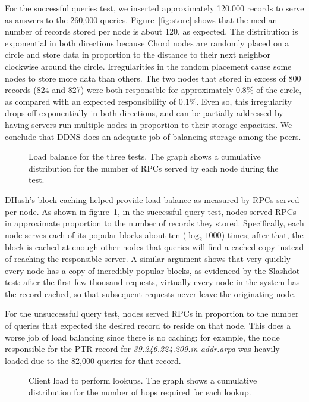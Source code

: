 For the successful queries test, we inserted approximately 120,000
records to serve as answers to the 260,000 queries.
Figure~\ref{fig:store} shows that the median number of
records stored per node is about 120, as expected.
The distribution is exponential in both directions because
Chord nodes are randomly placed on a circle and store data
in proportion to the distance to their next neighbor clockwise
around the circle.  Irregularities in the random placement cause
some nodes to store more data than others.
The two nodes that stored in excess of 800
records (824 and 827) were both responsible for approximately
0.8\% of the circle, as compared with an expected 
responsibility of 0.1\%.
Even so, this irregularity drops off exponentially in both
directions, and can be partially addressed by having servers
run multiple nodes in proportion to their storage capacities.
We conclude that DDNS does an adequate job of balancing
storage among the peers.

\begin{figure}
\caption{Load balance for the three tests.
The graph shows a cumulative distribution for the number
of RPCs served by each node during the test.}
\label{fig:both-rpc}
\end{figure}

DHash's block caching helped provide load balance as
measured by RPCs served per node.
As shown in figure~\ref{fig:both-rpc},
in the successful query test, nodes served RPCs in
approximate proportion to the number of records they stored.
Specifically, each node serves each of its popular blocks about
ten ($\log_2 1000$) times; after that, the block is cached
at enough other nodes that queries will find a cached copy
instead of reaching the responsible server.
A similar argument shows that very quickly every node has
a copy of incredibly popular blocks, as evidenced by the
Slashdot test: after the first few thousand requests, virtually
every node in the system has the record cached, so that
subsequent requests never leave the originating node.

For the unsuccessful query test, nodes served RPCs in 
proportion to the number of queries that expected the
desired record to reside on that node.
This does a worse job of load balancing since there is
no caching; for example, the node responsible for the
PTR record for {\em 39.246.224.209.in-addr.arpa} was
heavily loaded due to the 82,000 queries for that record.

\begin{figure}
\caption{Client load to perform lookups. 
The graph shows a cumulative distribution for the number
of hops required for each lookup.}
\label{fig:hops}
\end{figure}

